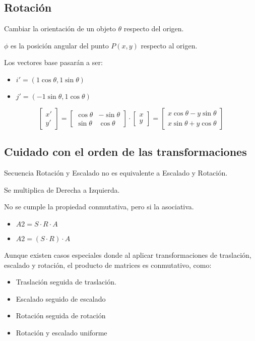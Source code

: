 \subsection{Rotación}
Cambiar la orientación de un objeto $\theta$ respecto del origen.

$\phi$ es la posición angular del punto $P(x, y)$ respecto al origen.

Los vectores base pasarán a ser:
\begin{itemize}
    \item $i'=(1 \cos \theta , 1 \sin \theta)$
    \item $j'=(-1 \sin \theta, 1 \cos \theta)$
\end{itemize}

$$\left[\begin{matrix}
x' \\ y'
\end{matrix}\right] =
\left[\begin{matrix}
\cos \theta & - \sin \theta \\ \sin \theta & \cos \theta
\end{matrix}\right] \cdot
\left[\begin{matrix}
x \\ y
\end{matrix}\right]=
\left[\begin{matrix}
x \cos \theta - y \sin \theta \\ x \sin \theta + y \cos \theta
\end{matrix}\right]$$

\subsection{Cuidado con el orden de las transformaciones}
Secuencia Rotación y Escalado no es equivalente a Escalado y Rotación.

Se multiplica de Derecha a Izquierda.

No se cumple la propiedad conmutativa, pero si la asociativa.
\begin{itemize}
    \item $A2 = S \cdot R \cdot A$
    \item $A2 = (S \cdot R) \cdot A$
\end{itemize}

Aunque existen casos especiales donde al aplicar transformaciones de traslación, escalado y rotación, el producto de matrices es conmutativo, como:
\begin{itemize}
    \item Traslación seguida de traslación.
    \item Escalado seguido de escalado
    \item Rotación seguida de rotación
    \item Rotación y escalado uniforme
\end{itemize}

